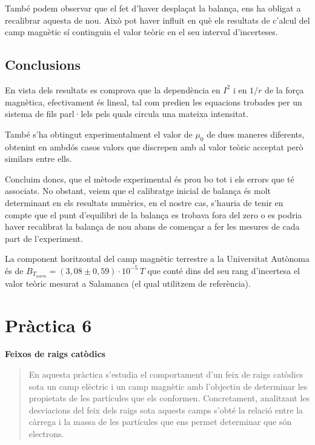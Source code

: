 \documentclass[11pt]{article}
\numberwithin{equation}{section}
\numberwithin{figure}{section}
\numberwithin{table}{section}
\begin{document}
També podem observar que el fet d'haver desplaçat la balança, ens ha obligat a recalibrar aquesta de nou. Això pot haver influit en què els resultats de c'alcul del camp magnètic sí continguin el valor teòric en el seu interval d'incerteses.

\subsection{Conclusions}\label{sec: PR2_concl}

En vista dels resultats es comprova que la dependència en $I^2$ i en $1/r$ de la força magnètica, efectivament és lineal, tal com predien les equacions trobades per un sistema de fils parl·lels pels quals circula una mateixa intensitat. 

També s’ha obtingut experimentalment el valor de $\mu_0$ de dues maneres diferents, obtenint en ambdós casos valors que discrepen amb al valor teòric acceptat però similars entre ells.

Concluim doncs, que el mètode experimental és prou bo tot i els errors que té associats. No obstant, veiem que el calibratge inicial de balança és molt determinant en els resultats numèrics, en el nostre cas, s'hauria de tenir en compte que el punt d'equilibri de la balança es trobava fora del zero o es podria haver recalibrat la balança de nou abans de començar a fer les mesures de cada part de l'experiment.

La component horitzontal del camp magnètic terrestre a la Universitat Autònoma és de $B_{T_{norm}}= (3,08 \pm 0,59)\cdot10^{-5} \, T$ que conté dins del seu rang d’incertesa el valor teòric mesurat a Salamanca (el qual utilitzem de referència).

\newpage

\section{\huge \textbf{Pràctica 6}}  %

\vspace{.5em}  %

{\Huge \textbf{Feixos de raigs catòdics}}  %

\begin{abstract}
     En aquesta pràctica s'estudia el comportament d'un feix de raigs catòdics sota un camp elèctric i un camp magnètic amb l'objectiu de determinar les propietats de les partícules que els conformen. Concretament, analitzant les desviacions del feix dels raigs sota aquests camps s'obté la relació entre la càrrega i la massa de les partícules que ens permet determinar que són electrons.
\end{abstract}
\end{document}
